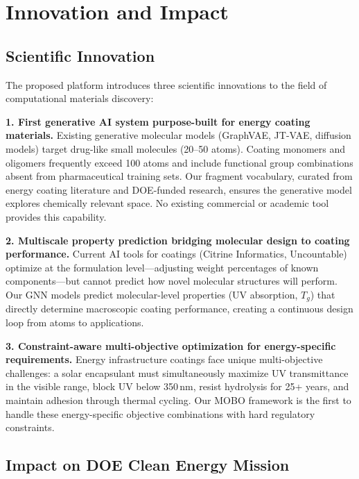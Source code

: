 \documentclass[11pt,letterpaper]{article}
\begin{document}
\section{Innovation and Impact}
\label{sec:innovation}

\subsection{Scientific Innovation}

The proposed platform introduces three scientific innovations to the field of computational materials discovery:

\textbf{1. First generative AI system purpose-built for energy coating materials.} Existing generative molecular models (GraphVAE, JT-VAE, diffusion models) target drug-like small molecules (20--50 atoms). Coating monomers and oligomers frequently exceed 100 atoms and include functional group combinations absent from pharmaceutical training sets. Our fragment vocabulary, curated from energy coating literature and DOE-funded research, ensures the generative model explores chemically relevant space. No existing commercial or academic tool provides this capability.

\textbf{2. Multiscale property prediction bridging molecular design to coating performance.} Current AI tools for coatings (Citrine Informatics, Uncountable) optimize at the formulation level---adjusting weight percentages of known components---but cannot predict how novel molecular structures will perform. Our GNN models predict molecular-level properties (UV absorption, $T_g$) that directly determine macroscopic coating performance, creating a continuous design loop from atoms to applications.

\textbf{3. Constraint-aware multi-objective optimization for energy-specific requirements.} Energy infrastructure coatings face unique multi-objective challenges: a solar encapsulant must simultaneously maximize UV transmittance in the visible range, block UV below 350\,nm, resist hydrolysis for 25+ years, and maintain adhesion through thermal cycling. Our MOBO framework is the first to handle these energy-specific objective combinations with hard regulatory constraints.

\subsection{Impact on DOE Clean Energy Mission}
\end{document}

